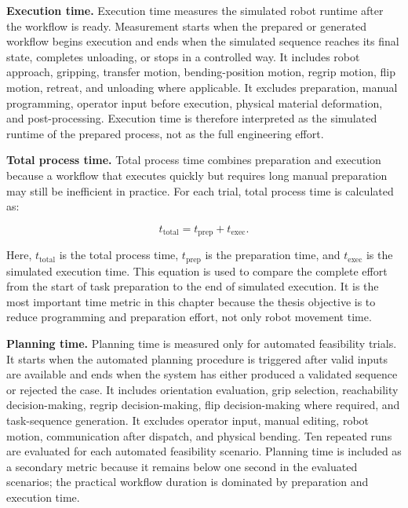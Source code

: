 \label{subsec:execution-time-definition}
\noindent\textbf{Execution time.}
Execution time measures the simulated robot runtime after the workflow is ready. Measurement starts when the prepared or generated workflow begins execution and ends when the simulated sequence reaches its final state, completes unloading, or stops in a controlled way. It includes robot approach, gripping, transfer motion, bending-position motion, regrip motion, flip motion, retreat, and unloading where applicable. It excludes preparation, manual programming, operator input before execution, physical material deformation, and post-processing. Execution time is therefore interpreted as the simulated runtime of the prepared process, not as the full engineering effort.

\label{subsec:total-process-time-definition}
\noindent\textbf{Total process time.}
Total process time combines preparation and execution because a workflow that executes quickly but requires long manual preparation may still be inefficient in practice. For each trial, total process time is calculated as:

\begin{equation}
t_{\mathrm{total}}=t_{\mathrm{prep}}+t_{\mathrm{exec}} .
\label{eq:total-process-time}
\end{equation}

Here, \(t_{\mathrm{total}}\) is the total process time, \(t_{\mathrm{prep}}\) is the preparation time, and \(t_{\mathrm{exec}}\) is the simulated execution time. This equation is used to compare the complete effort from the start of task preparation to the end of simulated execution. It is the most important time metric in this chapter because the thesis objective is to reduce programming and preparation effort, not only robot movement time.

\label{subsec:planning-time-definition}
\noindent\textbf{Planning time.}
Planning time is measured only for automated feasibility trials. It starts when the automated planning procedure is triggered after valid inputs are available and ends when the system has either produced a validated sequence or rejected the case. It includes orientation evaluation, grip selection, reachability decision-making, regrip decision-making, flip decision-making where required, and task-sequence generation. It excludes operator input, manual editing, robot motion, communication after dispatch, and physical bending. Ten repeated runs are evaluated for each automated feasibility scenario. Planning time is included as a secondary metric because it remains below one second in the evaluated scenarios; the practical workflow duration is dominated by preparation and execution time.

